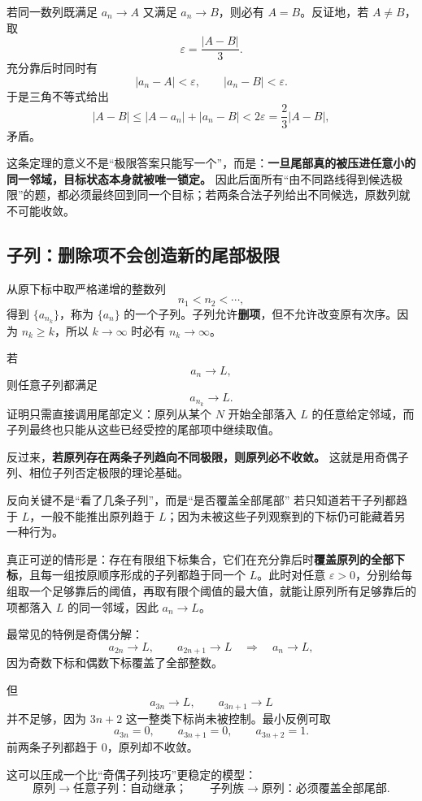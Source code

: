 \documentclass[11pt,a4paper]{ctexart}
\newcommand{\kw}[1]{\textbf{\color{deep}#1}}
\begin{document}
若同一数列既满足 $a_n\to A$ 又满足 $a_n\to B$，则必有 $A=B$。反证地，若 $A\ne B$，取
\[
\varepsilon=\frac{\lvert A-B\rvert}{3}.
\]
充分靠后时同时有
\[
\lvert a_n-A\rvert<\varepsilon,
\qquad
\lvert a_n-B\rvert<\varepsilon.
\]
于是三角不等式给出
\[
\lvert A-B\rvert
\le \lvert A-a_n\rvert+\lvert a_n-B\rvert
<2\varepsilon
=\frac23\lvert A-B\rvert,
\]
矛盾。

这条定理的意义不是“极限答案只能写一个”，而是：\kw{一旦尾部真的被压进任意小的同一邻域，目标状态本身就被唯一锁定。} 因此后面所有“由不同路线得到候选极限”的题，都必须最终回到同一个目标；若两条合法子列给出不同候选，原数列就不可能收敛。

\subsection{子列：删除项不会创造新的尾部极限}

从原下标中取严格递增的整数列
\[
n_1<n_2<\cdots,
\]
得到 $\{a_{n_k}\}$，称为 $\{a_n\}$ 的一个子列。子列允许\textbf{删项}，但不允许改变原有次序。因为 $n_k\ge k$，所以 $k\to\infty$ 时必有 $n_k\to\infty$。

若
\[
a_n\to L,
\]
则任意子列都满足
\[
a_{n_k}\to L.
\]
证明只需直接调用尾部定义：原列从某个 $N$ 开始全部落入 $L$ 的任意给定邻域，而子列最终也只能从这些已经受控的尾部项中继续取值。

反过来，\textbf{若原列存在两条子列趋向不同极限，则原列必不收敛。} 这就是用奇偶子列、相位子列否定极限的理论基础。

\begin{corebox}{反向关键不是“看了几条子列”，而是“是否覆盖全部尾部”}
若只知道若干子列都趋于 $L$，一般不能推出原列趋于 $L$；因为未被这些子列观察到的下标仍可能藏着另一种行为。

真正可逆的情形是：存在有限组下标集合，它们在充分靠后时\textbf{覆盖原列的全部下标}，且每一组按原顺序形成的子列都趋于同一个 $L$。此时对任意 $\varepsilon>0$，分别给每组取一个足够靠后的阈值，再取有限个阈值的最大值，就能让原列所有足够靠后的项都落入 $L$ 的同一邻域，因此 $a_n\to L$。

最常见的特例是奇偶分解：
\[
a_{2n}\to L,
\qquad
 a_{2n+1}\to L
\quad\Longrightarrow\quad
 a_n\to L,
\]
因为奇数下标和偶数下标覆盖了全部整数。

但
\[
a_{3n}\to L,
\qquad
 a_{3n+1}\to L
\]
并不足够，因为 $3n+2$ 这一整类下标尚未被控制。最小反例可取
\[
a_{3n}=0,
\qquad
 a_{3n+1}=0,
\qquad
 a_{3n+2}=1.
\]
前两条子列都趋于 $0$，原列却不收敛。
\end{corebox}

这可以压成一个比“奇偶子列技巧”更稳定的模型：
\[
\boxed{\text{原列}\to\text{任意子列：自动继承；}\qquad
\text{子列族}\to\text{原列：必须覆盖全部尾部}.}
\]
\end{document}
